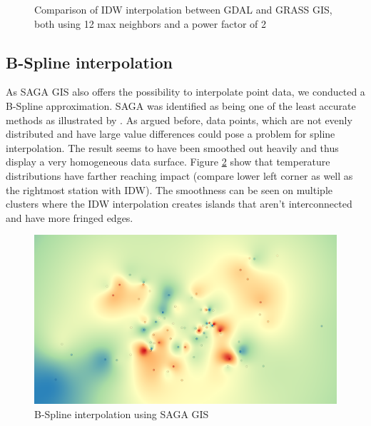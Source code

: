 \begin{figure}
	\centering
	\hfill
	\caption[Comparison of IDW interpolation between GDAL and GRASS GIS]{Comparison of IDW interpolation between GDAL and GRASS GIS, both using 12 max neighbors and a power factor of 2}
	\label{fig:result_idw_gdal_grass}
\end{figure}

\subsection{B-Spline interpolation}

As SAGA GIS also offers the possibility to interpolate point data, we conducted a B-Spline approximation. SAGA was identified as being one of the least accurate methods as illustrated by \citeauthor{wenjing_cao_study_2009}. As argued before, data points, which are not evenly distributed and have large value differences could pose a problem for spline interpolation. The result seems to have been \ldq{}smoothed\rdq{} out heavily and thus display a very homogeneous data surface. Figure \ref{fig:result_bspline} show that temperature distributions have farther reaching impact (compare lower left corner as well as the rightmost station with IDW). The smoothness can be seen on multiple clusters where the IDW interpolation creates islands that aren't interconnected and have more fringed edges.

\begin{figure}[H]
	\centering
	\includegraphics[width=.7\linewidth]{comparison/compare_bspline_saga.png}
	\caption{B-Spline interpolation using SAGA GIS}
	\label{fig:result_bspline}
\end{figure}
